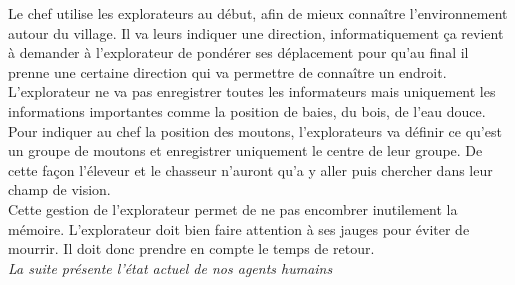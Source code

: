 \documentclass[12pt]{article}
\begin{document}
Le chef utilise les explorateurs au début, afin de mieux connaître 
l'environnement autour du village. Il va leurs indiquer une direction, 
informatiquement ça revient à demander à l'explorateur de pondérer ses 
déplacement pour qu'au final il prenne une certaine direction qui va permettre 
de connaître un endroit.\\

L'explorateur ne va pas enregistrer toutes les informateurs mais uniquement 
les informations importantes comme la position de baies, du bois, de l'eau douce. 
Pour indiquer au chef la position des moutons, l'explorateurs va définir ce 
qu'est un groupe de moutons et enregistrer uniquement le centre de leur 
groupe. De cette façon l'éleveur et le chasseur n'auront qu'a y aller puis 
chercher dans leur champ de vision.\\

Cette gestion de l'explorateur permet de ne pas encombrer inutilement la mémoire. 
L'explorateur doit bien faire attention à ses jauges pour éviter de mourrir. Il 
doit donc prendre en compte le temps de retour.\\

\textit{La suite présente l'état actuel de nos agents humains\\}
\end{document}
